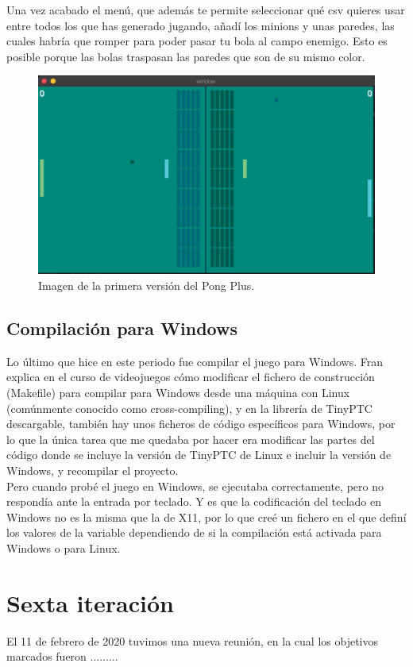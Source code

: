 Una vez acabado el menú, que además te permite seleccionar qué \gls{csv} quieres usar entre todos los que has generado jugando, añadí los minions y unas paredes, las cuales habría que romper para poder pasar tu bola al campo enemigo. Esto es posible porque las bolas traspasan las paredes que son de su mismo color.

\begin{figure}[h]
	\centering
	\includegraphics[width=15cm]{archivos/imagenes/pong-plus-con-minions-y-paredes.png}
	\caption{Imagen de la primera versión del Pong Plus.}
\end{figure}

\subsection{Compilación para Windows}
Lo último que hice en este periodo fue compilar el juego para Windows. Fran explica en el curso de videojuegos \cite{CursoMotorC++} cómo modificar el fichero de construcción (Makefile) para compilar para Windows desde una máquina con Linux (comúnmente conocido como cross-compiling), y en la librería de TinyPTC descargable, también hay unos ficheros de código específicos para Windows, por lo que la única tarea que me quedaba por hacer era modificar las partes del código donde se incluye la versión de TinyPTC de Linux e incluir la versión de Windows, y recompilar el proyecto. 
\\
Pero cuando probé el juego en Windows, se ejecutaba correctamente, pero no respondía ante la entrada por teclado. Y es que la codificación del teclado en Windows no es la misma que la de X11, por lo que creé un fichero en el que definí los valores de la variable dependiendo de si la compilación está activada para Windows o para Linux.

\section{Sexta iteración}
El 11 de febrero de 2020 tuvimos una nueva reunión, en la cual los objetivos marcados fueron .........
